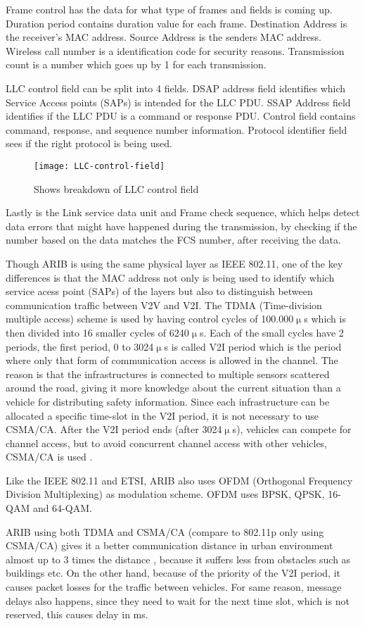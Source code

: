 Frame control has the data for what type of frames and fields is coming up. Duration period contains duration value for each frame. Destination Address is the receiver's MAC address. Source Address is the senders MAC address. Wireless call number is a identification code for security reasons. Transmission count is a number which goes up by 1 for each transmission. 

LLC control field can be split into 4 fields. DSAP address field identifies which Service Access points (SAPs) is intended for the LLC PDU. SSAP Address field identifies if the LLC PDU is a command or response PDU. Control field contains command, response, and sequence number information. Protocol identifier field sees if the right protocol is being used.
\begin{figure}[h]
    \centering
    \texttt{[image: LLC-control-field]}
    \caption{Shows breakdown of LLC control field}
    \label{fig:LLC}
\end{figure}
Lastly is the Link service data unit and Frame check sequence, which helps detect data errors that might have happened during the transmission, by checking if the number based on the data matches the FCS number, after receiving the data. 
\par
% 
Though ARIB is using the same physical layer as IEEE 802.11, one of the key differences is that the MAC address not only is being used to identify which service acess point (SAPs) of the layers but also to distinguish between communication traffic between V2V and V2I. The TDMA (Time-division multiple access) scheme is used by having control cycles of 100.000$\upmu$s which is then divided into 16 smaller cycles of  6240$\upmu$s. Each of the small cycles have 2 periods, the first period, 0 to 3024$\upmu$s is called V2I period which is the period where only that form of communication access is allowed in the channel. The reason is that the infrastructures is connected to multiple sensors scattered around the road, giving it more knowledge about the current situation than a vehicle for distributing safety information. Since each infrastructure can be allocated a specific time-slot in the V2I period, it is not necessary to use CSMA/CA. After the V2I period ends (after 3024$\upmu$s), vehicles can compete for channel access, but to avoid concurrent channel access with other vehicles, CSMA/CA is used \cite{Heinovski2016PerformanceSTD-T109}.\par
% 
Like the IEEE 802.11 and ETSI, ARIB also uses OFDM (Orthogonal Frequency Division 
Multiplexing) as modulation scheme. OFDM uses BPSK, QPSK, 16-QAM and 64-QAM\footnotemark.\par
% 
% 
ARIB using both TDMA and CSMA/CA (compare to 802.11p only using CSMA/CA) gives it a better communication distance in urban environment almost up to 3 times the distance \cite{Heinovski2016PerformanceSTD-T109}, because it suffers less from obstacles such as buildings etc. On the other hand, because of the priority of the V2I period, it causes packet losses for the traffic between vehicles. For same reason, message delays also happens, since they need to wait for the next time slot, which is not reserved, this causes delay in ms. 